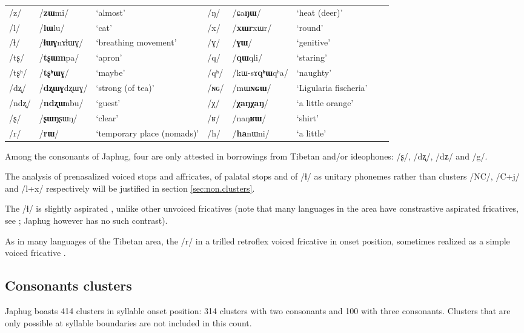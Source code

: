 \documentclass[oneside,a4paper,11pt]{article}
\newcommand{\ipa}[1]{\mbox{\phon/#1/}}
\newcommand{\phonet}[1]{\mbox{\phon[#1]}}
\begin{document}
\begin{table}[h]
{\begin{tabular}{lll|lllll}
 \ipa{z} & 	  \ipa{\textbf{zɯ}mi}   & 	 `almost' & \ipa{ŋ} & 	\ipa{ɕa\textbf{ŋɯ}}   & 	 `heat (deer)' \\ 
 \ipa{l} & 	  \ipa{\textbf{lɯ}lu}   & 	 `cat' & \ipa{x} & 	\ipa{\textbf{xɯr}xɯr}   & 	 `round' \\ 
 \ipa{ɬ} & 	  \ipa{\textbf{ɬɯɣ}nɤɬɯɣ}   & 	 `breathing movement' & \ipa{ɣ} & 	\ipa{\textbf{ɣɯ}}   & 	 `genitive' \\ 
 \ipa{tʂ} & 	 \ipa{\textbf{tʂɯm}pa}   & 	 `apron' & \ipa{q} & 	\ipa{\textbf{qɯ}qli}   & 	 `staring' \\ 
 \ipa{tʂʰ} & 	  \ipa{\textbf{tʂʰɯɣ}}   & 	 `maybe' & \ipa{qʰ} & 	\ipa{kɯ-sɤ\textbf{qʰɯ}qʰa}   & 	 `naughty' \\ 
 \ipa{dʐ} & 	\ipa{\textbf{dʐɯɣ}dʐɯɣ}   & 	 `strong (of tea)' & \ipa{ɴɢ} & 	\ipa{mɯ\textbf{ɴɢɯ}}  & 	 `Ligularia fischeria' \\ 
 \ipa{ndʐ} & 	\ipa{\textbf{ndʐɯ}nbu}   & 	 `guest' & \ipa{χ} & 	\ipa{\textbf{χaŋχaŋ}}   & 	 `a little orange' \\ 
 \ipa{ʂ} & 	\ipa{\textbf{ʂɯŋ}ʂɯŋ}   & 	 `clear' & \ipa{ʁ} & 	\ipa{naŋ\textbf{ʁɯ}}   & 	 `shirt' \\ 
 \ipa{r} & 	\ipa{\textbf{rɯ}}   & 	 `temporary place (nomads)' & 	  \ipa{h}&\ipa{\textbf{ha}nɯni} 	 & `a little'	 \\ 
\bottomrule
\end{tabular}}
\end{table}

Among the consonants of Japhug, four are only attested in borrowings from Tibetan and/or ideophones: \ipa{ʂ}, \ipa{dʐ}, \ipa{dʑ} and \ipa{g}.

The analysis of prenasalized voiced stops and affricates, of palatal stops and of \ipa{ɬ} as unitary phonemes rather than clusters \ipa{NC}, \ipa{C+j} and \ipa{l+x} respectively will be justified in section \ref{sec:non.clusters}. 

The \ipa{ɬ} is slightly aspirated \phonet{ɬʰ}, unlike other unvoiced fricatives (note that many languages in the area have constrastive aspirated fricatives, see \citealt{jacques11lingua}; Japhug however has no such contrast).


As in many languages of the Tibetan area, the \ipa{r} in a trilled retroflex voiced fricative \phonet{ɽ͡ʐ} in onset position, sometimes realized as a simple voiced fricative \phonet{ʐ}.


  \subsection{Consonants clusters} \label{sec:clusters}
  Japhug boasts 414 clusters in syllable onset position:  314 clusters with two consonants and 100 with three consonants. Clusters that are only possible at syllable boundaries are not included in this count. 
  
\end{document}
